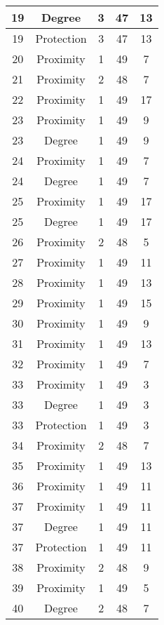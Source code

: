 \documentclass[results.tex]{subfiles}
\begin{document}
\begin{center}
\begin{tabular}{| c || c | c | c | c |}
    19 & Degree & 3 & 47 & 13 \\ 
    \hline
    19 & Protection & 3 & 47 & 13 \\ 
    \hline
    20 & Proximity & 1 & 49 & 7 \\ 
    \hline
    21 & Proximity & 2 & 48 & 7 \\ 
    \hline
    22 & Proximity & 1 & 49 & 17 \\ 
    \hline
    23 & Proximity & 1 & 49 & 9 \\ 
    \hline
    23 & Degree & 1 & 49 & 9 \\ 
    \hline
    24 & Proximity & 1 & 49 & 7 \\ 
    \hline
    24 & Degree & 1 & 49 & 7 \\ 
    \hline
    25 & Proximity & 1 & 49 & 17 \\ 
    \hline
    25 & Degree & 1 & 49 & 17 \\ 
    \hline
    26 & Proximity & 2 & 48 & 5 \\ 
    \hline
    27 & Proximity & 1 & 49 & 11 \\ 
    \hline
    28 & Proximity & 1 & 49 & 13 \\ 
    \hline
    29 & Proximity & 1 & 49 & 15 \\ 
    \hline
    30 & Proximity & 1 & 49 & 9 \\ 
    \hline
    31 & Proximity & 1 & 49 & 13 \\ 
    \hline
    32 & Proximity & 1 & 49 & 7 \\ 
    \hline
    33 & Proximity & 1 & 49 & 3 \\ 
    \hline
    33 & Degree & 1 & 49 & 3 \\ 
    \hline
    33 & Protection & 1 & 49 & 3 \\ 
    \hline
    34 & Proximity & 2 & 48 & 7 \\ 
    \hline
    35 & Proximity & 1 & 49 & 13 \\ 
    \hline
    36 & Proximity & 1 & 49 & 11 \\ 
    \hline
    37 & Proximity & 1 & 49 & 11 \\ 
    \hline
    37 & Degree & 1 & 49 & 11 \\ 
    \hline
    37 & Protection & 1 & 49 & 11 \\ 
    \hline
    38 & Proximity & 2 & 48 & 9 \\ 
    \hline
    39 & Proximity & 1 & 49 & 5 \\ 
    \hline
    40 & Degree & 2 & 48 & 7 \\ 
    \hline

\end{tabular}
\end{center}
\end{document}
